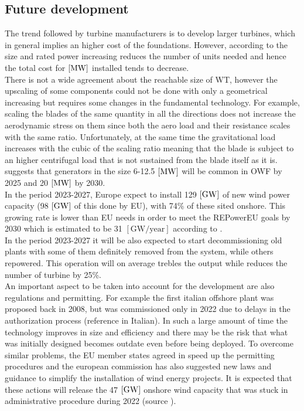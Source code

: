 \subsection{Future development}
The trend followed by turbine manufacturers is to develop larger turbines, which in general implies an higher cost of the foundations. However, according to \cite{current_staus_and_future_trends_of_offshore_wind_power_in_europe} the size and rated power increasing reduces the number of units needed and hence the total cost for $\left[\si{\mega\watt}\right]$ installed tends to decrease.\\
There is not a wide agreement about the reachable size of WT, however the upscaling of some components could not be done with only a geometrical increasing but requires some changes in the fundamental technology. For example, scaling the blades of the same quantity in all the directions does not increase the aerodynamic stress on them since both the aero load and their resistance scales with the same ratio. Unfortunately, at the same time the gravitational load increases with the cubic of the scaling ratio meaning that the blade is subject to an higher centrifugal load that is not sustained from the blade itself as it is. \\
\cite{current_staus_and_future_trends_of_offshore_wind_power_in_europe} suggests that generators in the size 6-12.5 $\left[\si{\mega\watt}\right]$ will be common in OWF by 2025 and 20 $\left[\si{\mega\watt}\right]$ by 2030.\\
In the period 2023-2027, Europe expect to install 129 $\left[\si{\giga\watt}\right]$ of new wind power capacity (98 $\left[\si{\giga\watt}\right]$ of this done by EU), with 74\% of these sited onshore. This growing rate is lower than EU needs in order to meet the REPowerEU goals by 2030 which is estimated to be 31 $\left[\text{GW/year}\right]$ according to \cite{wind_europe_data_2022}. \\
In the period 2023-2027 it will be also expected to start decommissioning old plants with some of them definitely removed from the system, while others repowered. This operation will on average trebles the output while reduces the number of turbine by 25\%. \\
An important aspect to be taken into account for the development are also regulations and permitting. For example the first italian offshore plant was proposed back in 2008, but was commissioned only in 2022 due to delays in the authorization process \cite{il_post} (reference in Italian). In such a large amount of time the technology improves in size and efficiency and there may be the risk that what was initially designed becomes outdate even before being deployed. To overcome similar problems, the EU member states agreed in speed up the permitting procedures and the european commission has also suggested new laws and guidance to simplify the installation of wind energy projects. It is expected that these actions will release the 47 $\left[\si{\giga\watt}\right]$ onshore wind capacity that was stuck in administrative procedure during 2022 (source \cite{wind_europe_data_2022}).  